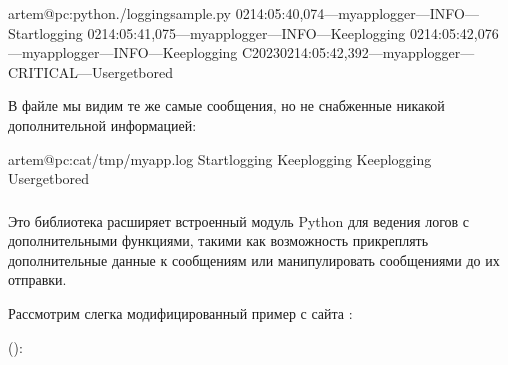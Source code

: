 \documentclass[letterpaper,10pt,russian]{sphinxmanual}
\begin{document}
\begin{sphinxVerbatim}[commandchars=\\\{\}]
artem@pc:\PYGZti{}\PYGZdl{}python./logging\PYGZus{}sample.py
\PYGZhy{}02\PYGZhy{}14:05:40,074—my\PYGZus{}app\PYGZus{}logger—INFO—Startlogging
\PYGZhy{}02\PYGZhy{}14:05:41,075—my\PYGZus{}app\PYGZus{}logger—INFO—Keeplogging
\PYGZhy{}02\PYGZhy{}14:05:42,076—my\PYGZus{}app\PYGZus{}logger—INFO—Keeplogging
\PYGZca{}C2023\PYGZhy{}02\PYGZhy{}14:05:42,392—my\PYGZus{}app\PYGZus{}logger—CRITICAL—Usergetbored
\end{sphinxVerbatim}

\sphinxAtStartPar
В файле мы видим те же самые сообщения, но не снабженные никакой дополнительной информацией:

\begin{sphinxVerbatim}[commandchars=\\\{\}]
artem@pc:\PYGZti{}\PYGZdl{}cat/tmp/my\PYGZus{}app.log
Startlogging
Keeplogging
Keeplogging
Usergetbored
\end{sphinxVerbatim}


\subsubsection{}
\label{\detokenize{educational_materials/logging/content:structlog}}
\sphinxAtStartPar
Это библиотека расширяет встроенный модуль Python для ведения логов с дополнительными функциями, такими как возможность прикреплять дополнительные данные к сообщениям или манипулировать сообщениями до их отправки.

\sphinxAtStartPar
Рассмотрим слегка модифицированный пример с сайта :

\sphinxAtStartPar
():
\end{document}
